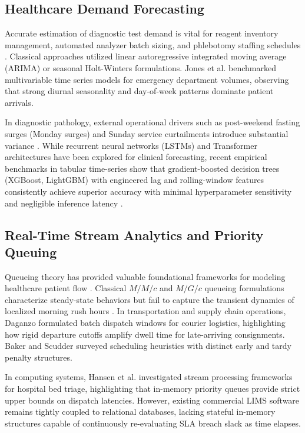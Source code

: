 \documentclass[conference]{IEEEtran}
\begin{document}
\subsection{Healthcare Demand Forecasting}
Accurate estimation of diagnostic test demand is vital for reagent inventory management, automated analyzer batch sizing, and phlebotomy staffing schedules \cite{jones2008forecasting}. Classical approaches utilized linear autoregressive integrated moving average (ARIMA) or seasonal Holt-Winters formulations. Jones et al. \cite{jones2008forecasting} benchmarked multivariable time series models for emergency department volumes, observing that strong diurnal seasonality and day-of-week patterns dominate patient arrivals. 

In diagnostic pathology, external operational drivers such as post-weekend fasting surges (Monday surges) and Sunday service curtailments introduce substantial variance \cite{lalpathlabs2023operational}. While recurrent neural networks (LSTMs) and Transformer architectures have been explored for clinical forecasting, recent empirical benchmarks in tabular time-series show that gradient-boosted decision trees (XGBoost, LightGBM) with engineered lag and rolling-window features consistently achieve superior accuracy with minimal hyperparameter sensitivity and negligible inference latency \cite{chenxgboost2016}.

\subsection{Real-Time Stream Analytics and Priority Queuing}
Queueing theory has provided valuable foundational frameworks for modeling healthcare patient flow \cite{armony2015patient,green2006queueing}. Classical $M/M/c$ and $M/G/c$ queueing formulations characterize steady-state behaviors but fail to capture the transient dynamics of localized morning rush hours \cite{belson2007technology}. In transportation and supply chain operations, Daganzo \cite{daganzo1997fundamentals} formulated batch dispatch windows for courier logistics, highlighting how rigid departure cutoffs amplify dwell time for late-arriving consignments. Baker and Scudder \cite{baker1984sequencing} surveyed scheduling heuristics with distinct early and tardy penalty structures.

In computing systems, Hansen et al. \cite{hansen2021improving} investigated stream processing frameworks for hospital bed triage, highlighting that in-memory priority queues provide strict upper bounds on dispatch latencies. However, existing commercial LIMS software remains tightly coupled to relational databases, lacking stateful in-memory structures capable of continuously re-evaluating SLA breach slack as time elapses.
\end{document}
